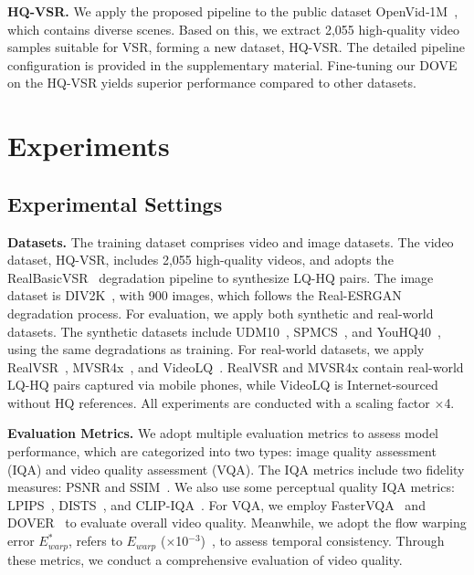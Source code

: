 \documentclass{article}
\begin{document}
\textbf{HQ-VSR.}
We apply the proposed pipeline to the public dataset OpenVid‑1M~\cite{nan2024openvid}, which contains diverse scenes. Based on this, we extract 2,055 high-quality video samples suitable for VSR, forming a new dataset, HQ-VSR. The detailed pipeline configuration is provided in the supplementary material. Fine-tuning our DOVE on the HQ-VSR yields superior performance compared to other datasets. 

\section{Experiments}
\subsection{Experimental Settings}
\label{sec:setting}
\noindent \textbf{Datasets.}
The training dataset comprises video and image datasets. The video dataset, HQ-VSR, includes 2,055 high-quality videos, and adopts the RealBasicVSR~\cite{chan2022investigating} degradation pipeline to synthesize LQ-HQ pairs. The image dataset is DIV2K~\cite{cai2019toward}, with 900 images, which follows the Real-ESRGAN~\cite{wang2021real} degradation process. For evaluation, we apply both synthetic and real-world datasets. The synthetic datasets include UDM10~\cite{tao2017detail}, SPMCS~\cite{yi2019progressive}, and YouHQ40~\cite{zhou2024upscale}, using the same degradations as training. For real-world datasets, we apply RealVSR~\cite{yang2021real}, MVSR4x~\cite{wang2023benchmark}, and VideoLQ~\cite{chan2022investigating}.
RealVSR and MVSR4x contain real-world LQ-HQ pairs captured via mobile phones, while VideoLQ is Internet-sourced without HQ references.
All experiments are conducted with a scaling factor $\times$4.

\noindent \textbf{Evaluation Metrics.}
We adopt multiple evaluation metrics to assess model performance, which are categorized into two types: image quality assessment (IQA) and video quality assessment (VQA). The IQA metrics include two fidelity measures: PSNR and SSIM~\cite{wang2004image}. We also use some perceptual quality IQA metrics: LPIPS~\cite{zhang2018unreasonable}, DISTS~\cite{ding2020image}, and CLIP-IQA~\cite{wang2023exploring}. For VQA, we employ FasterVQA~\cite{wu2023neighbourhood} and DOVER~\cite{wu2023exploring} to evaluate overall video quality. Meanwhile, we adopt the flow warping error $E^*_{warp}$, refers to $E_{warp}$ ($\times$10$^{-3}$)~\cite{lai2018learning}, to assess temporal consistency. Through these metrics, we conduct a comprehensive evaluation of video quality.
\end{document}
